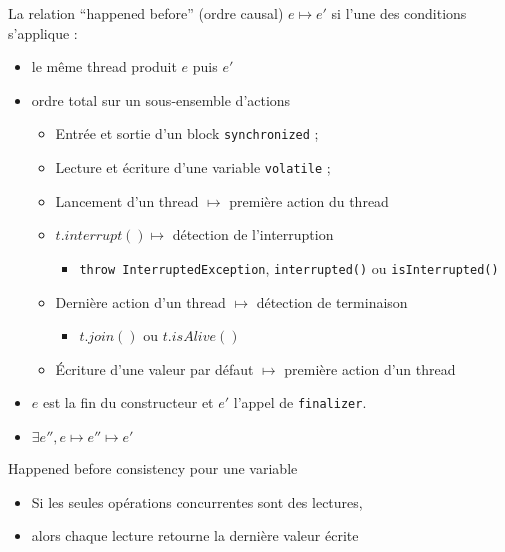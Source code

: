 
\begingroup

\begin{frame}{La relation ``happened before'' (ordre causal)}
  $e\mapsto e'$ si l'une des conditions s'applique :    
  \begin{itemize}
  \item {} le même thread produit $e$ puis $e'$
  \item {} ordre total sur un sous-ensemble d'actions
  \begin{itemize}
    \item Entrée et sortie d'un block \lstinline{synchronized} ;
    \item Lecture et écriture d'une variable \lstinline{volatile} ;
    \item Lancement d'un thread $\mapsto$ première action du thread
    \item $t.interrupt() \mapsto$ détection de l'interruption 
      \begin{itemize}
      \item \lstinline{throw InterruptedException}, \lstinline{interrupted()} ou \lstinline{isInterrupted()}
      \end{itemize}
    \item Dernière action d'un thread $\mapsto$ détection de terminaison
      \begin{itemize}
      \item $t.join()$ ou $t.isAlive()$
      \end{itemize}
    \item Écriture d'une valeur par défaut $\mapsto$ première action d'un thread
  \end{itemize}
  \item {} $e$ est la fin du constructeur et $e'$ l'appel de \lstinline{finalizer}.
  \item {} $\exists e'', e\mapsto e'' \mapsto e'$
  \end{itemize}
  \begin{alertblock}{Happened before consistency pour une variable}
  \begin{itemize}
  \item \alert{Si les seules opérations concurrentes sont des lectures,}
  \item alors chaque lecture retourne la dernière valeur écrite
  \end{itemize}
  \end{alertblock}
\end{frame}

\endgroup
\endinput

